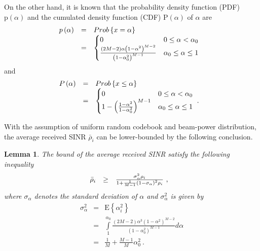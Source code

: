 \documentclass[10pt,fleqn, twocolumn]{IEEEtran}
\newtheorem{lemma}{Lemma}
\begin{document}
On the other hand, it is known that the probability density
function (PDF) $\mbox{p}\left(\alpha\right)$ and the cumulated
density function (CDF) $\mbox{P}\left(\alpha\right)$ of $\alpha$
are
\begin{equation}\hspace{-0.10in}
\begin{array}{rcl}
\mbox{p}\left(\alpha\right)&=&\mbox{Prob}\left\{x=\alpha\right\}\\
&=&\begin{cases}
0 & 0\leq \alpha < \alpha_{0} \\
\frac{\left(2M-2\right)\alpha\left(1-\alpha^2\right)^{M-2}}{\left(1-\alpha_{0}^{2}\right)^{M-1}}
& \alpha_{0}\leq\alpha\leq 1
\end{cases}
\end{array}
\end{equation}
\noindent and
\begin{equation}\hspace{-0.10in}
\begin{array}{rcl}
\mbox{P}\left(\alpha\right)&=&\mbox{Prob}\left\{x\leq\alpha\right\} \\
&=&
\begin{cases}
0 & 0 \leq\alpha < \alpha_{0} \\
1-\left(\frac{1-\alpha^2}{1-\alpha_{0}^2}\right)^{M-1} &
\alpha_{0}\leq\alpha\leq 1
\end{cases}\ .
\end{array}
\end{equation}

With the assumption of uniform random codebook and beam-power
distribution, the average received SINR $\bar\rho_{i}$ can be
lower-bounded by the following conclusion.
\begin{lemma} The bound of the average received SINR satisfy the
following inequality
\begin{equation}\hspace{-0.10in}
\begin{array}{rcl}
\bar\rho_{i}&\geq& \frac{\sigma_{\alpha}^{2}\rho_{i}}{1+
\frac{1}{M-1}\left(1-\sigma_{\alpha}\right)^{2}\rho_{i}}\ ,
\end{array}
\end{equation}
\noindent where  $\sigma_{\alpha}$ denotes the standard deviation
of $\alpha$ and $\sigma_{\alpha}^2$ is given by
\begin{equation}
\begin{array}{rcl}
\sigma_{\alpha}^2&=&\mbox{E}\left\{\alpha_{i}^2\right\}\\
&=&\int\limits_{1}^{\alpha_{0}}\frac{\left(2M-2\right)\alpha^3\left(1-\alpha^2\right)^{M-2}}{\left(1-\alpha_{0}^{2}\right)^{M-1}}d\alpha\\
&=&\frac{1}{M}+\frac{M-1}{M}\alpha_{0}^2\ .
\end{array}
\end{equation}
\end{lemma}
\end{document}
